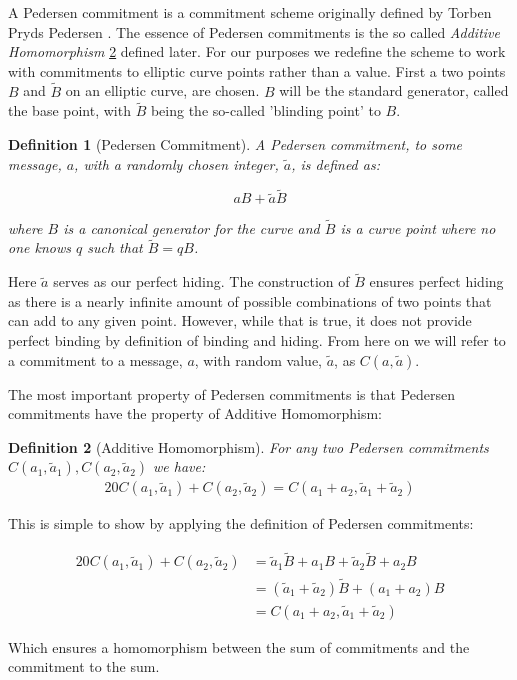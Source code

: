 \documentclass{article}
\newtheorem{definition}{Definition}[section]
\newcommand{\eq}[1]{\begin{alignat*}{20}#1\end{alignat*}}
\newcommand{\blind}[1]{\widetilde{#1}}
\newcommand{\tB}{\widetilde{B}}
\newcommand{\ba}{\widetilde{a}}
\begin{document}
A Pedersen commitment is a commitment scheme originally defined
by Torben Pryds Pedersen \cite{pedersen}. The essence of
Pedersen commitments is the so called \textit{Additive Homomorphism}
\ref{pedersen-additive-homomorphism} defined later. For our purposes we
redefine the scheme to work with commitments to elliptic curve points
rather than a value. First a two points $B$ and $\tB$ on an elliptic curve,
are chosen. $B$ will be the standard generator, called the base point, with
$\tB$ being the so-called 'blinding point' to $B$.

\begin{definition}[Pedersen Commitment]
	A Pedersen commitment, to some message, $a$, with a randomly chosen
	integer, $\ba$, is defined as:

	$$aB + \ba\blind{B}$$

	where $B$ is a canonical generator for the curve and $\tB$
	is a curve point where no one knows $q$ such that $\tB = qB$.
\end{definition}

Here $\widetilde{a}$ serves as our perfect hiding. The construction
of $\tB$ ensures perfect hiding as there is a nearly infinite amount
of possible combinations of two points that can add to any given
point. However, while that is true, it does not provide perfect binding
by definition of binding and hiding. From here on we will refer to
a commitment to a message, $a$, with random value, $\widetilde{a}$,
as $C(a,\widetilde{a})$.

The most important property of Pedersen commitments is
that Pedersen commitments have the property of Additive Homomorphism:

\begin{definition}[Additive Homomorphism] \label{pedersen-additive-homomorphism}
	For any two Pedersen commitments $C(a_1,\ba_1), C(a_2,\ba_2)$ we have:
	\eq{
		C(a_1,\ba_1) + C(a_2,\ba_2) = C(a_1 + a_2, \ba_1 + \ba_2)
	}
\end{definition}

This is simple to show by applying the definition of Pedersen
commitments: 

\eq{
	C(a_1,\ba_1) + C(a_2,\ba_2) &= \ba_1\tB + a_1B  + \ba_2\tB + a_2B \\
	                            &= (\ba_1 + \ba_2)\tB + (a_1 + a_2)B \\
	                            &= C(a_1 + a_2, \ba_1 + \ba_2)
}

Which ensures a homomorphism between the sum of commitments and the
commitment to the sum.
\end{document}
